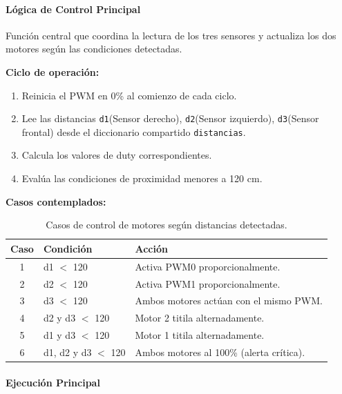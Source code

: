 \documentclass[12pt,a4paper]{article}
\begin{document}
\paragraph{Lógica de Control Principal}
\begin{itemize}

Función central que coordina la lectura de los tres sensores y actualiza los dos motores según las condiciones detectadas.

\textbf{Ciclo de operación:}

\begin{enumerate}
    \item Reinicia el PWM en 0\% al comienzo de cada ciclo.  
    \item Lee las distancias \texttt{d1}(Sensor derecho), \texttt{d2}(Sensor izquierdo), \texttt{d3}(Sensor frontal) desde el diccionario compartido \texttt{distancias}.  
    \item Calcula los valores de duty correspondientes.  
    \item Evalúa las condiciones de proximidad menores a 120 cm.  
\end{enumerate}

\textbf{Casos contemplados:}

\begin{table}[H]
\centering
\begin{tabular}{|c|p{5cm}|p{7cm}|}
\hline
\textbf{Caso} & \textbf{Condición} & \textbf{Acción} \\ \hline
1 & d1 $<$ 120 & Activa PWM0 proporcionalmente. \\ \hline
2 & d2 $<$ 120 & Activa PWM1 proporcionalmente. \\ \hline
3 & d3 $<$ 120 & Ambos motores actúan con el mismo PWM. \\ \hline
4 & d2 y d3 $<$ 120 & Motor 2 titila alternadamente. \\ \hline
5 & d1 y d3 $<$ 120 & Motor 1 titila alternadamente. \\ \hline
6 & d1, d2 y d3 $<$ 120 & Ambos motores al 100\% (alerta crítica). \\ \hline
\end{tabular}
\caption{Casos de control de motores según distancias detectadas.}
\end{table}
\end{itemize}

\paragraph{Ejecución Principal}
\end{document}
